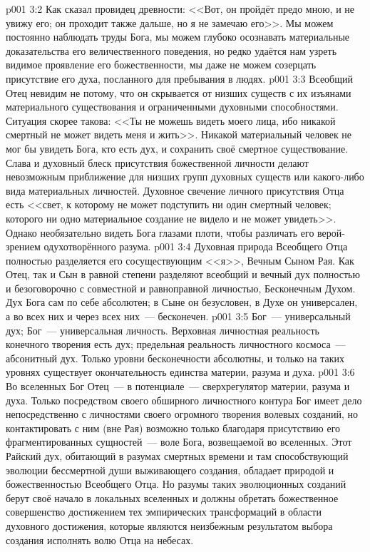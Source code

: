 \vs p001 3:2 Как сказал провидец древности: <<Вот, он пройдёт предо мною, и не увижу его; он проходит также дальше, но я не замечаю его>>. Мы можем постоянно наблюдать труды Бога, мы можем глубоко осознавать материальные доказательства его величественного поведения, но редко удаётся нам узреть видимое проявление его божественности, мы даже не можем созерцать присутствие его духа, посланного для пребывания в людях.
\vs p001 3:3 Всеобщий Отец невидим не потому, что он скрывается от низших существ с их изъянами материального существования и ограниченными духовными способностями. Ситуация скорее такова: <<Ты не можешь видеть моего лица, ибо никакой смертный не может видеть меня и жить>>. Никакой материальный человек не мог бы увидеть Бога, кто есть дух, и сохранить своё смертное существование. Слава и духовный блеск присутствия божественной личности делают невозможным приближение для низших групп духовных существ или какого\hyp{}либо вида материальных личностей. Духовное свечение личного присутствия Отца есть <<свет, к которому не может подступить ни один смертный человек; которого ни одно материальное создание не видело и не может увидеть>>. Однако необязательно видеть Бога глазами плоти, чтобы различать его верой\hyp{}зрением одухотворённого разума.
\vs p001 3:4 \pc Духовная природа Всеобщего Отца полностью разделяется его сосуществующим <<я>>, Вечным Сыном Рая. Как Отец, так и Сын в равной степени разделяют всеобщий и вечный дух полностью и безоговорочно с совместной и равноправной личностью, Бесконечным Духом. Дух Бога сам по себе абсолютен; в Сыне он безусловен, в Духе он универсален, а во всех них и через всех них~--- бесконечен.
\vs p001 3:5 \pc Бог~--- универсальный дух; Бог~--- универсальная личность. Верховная личностная реальность конечного творения есть дух; предельная реальность личностного космоса~--- абсонитный дух. Только уровни бесконечности абсолютны, и только на таких уровнях существует окончательность единства материи, разума и духа.
\vs p001 3:6 \pc Во вселенных Бог Отец~--- в потенциале~--- сверхрегулятор материи, разума и духа. Только посредством своего обширного личностного контура Бог имеет дело непосредственно с личностями своего огромного творения волевых созданий, но контактировать с ним (вне Рая) возможно только благодаря присутствию его фрагментированных сущностей~--- воле Бога, возвещаемой во вселенных. Этот Райский дух, обитающий в разумах смертных времени и там способствующий эволюции бессмертной души выживающего создания, обладает природой и божественностью Всеобщего Отца. Но разумы таких эволюционных созданий берут своё начало в локальных вселенных и должны обретать божественное совершенство достижением тех эмпирических трансформаций в области духовного достижения, которые являются неизбежным результатом выбора создания исполнять волю Отца на небесах.

